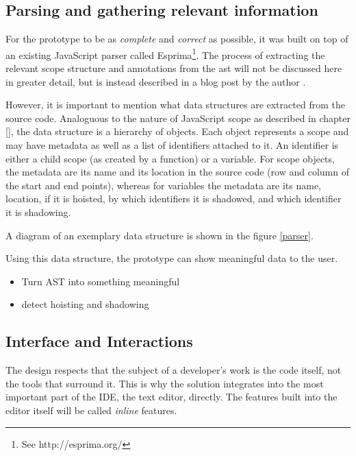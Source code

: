 \subsection{Parsing and gathering relevant
information}\label{parsing-and-gathering-relevant-information}

For the prototype to be as \emph{complete} and \emph{correct} as
possible, it was built on top of an existing JavaScript parser called
Esprima\footnote{See http://esprima.org/}. The process of extracting the
relevant scope structure and annotations from the \ac{ast} will not be
discussed here in greater detail, but is instead described in a blog
post by the author \cite{tvo}.

However, it is important to mention what data structures are extracted
from the source code. Analoguous to the nature of JavaScript scope as
described in chapter \ref{}, the data structure is a hierarchy of
objects. Each object represents a scope and may have metadata as well as
a list of identifiers attached to it. An identifier is either a child
scope (as created by a function) or a variable. For scope objects, the
metadata are its name and its location in the source code (row and
column of the start and end points), whereas for variables the metadata
are its name, location, if it is hoisted, by which identifiers it is
shadowed, and which identifier it is shadowing.

A diagram of an exemplary data structure is shown in the figure
\ref{parser}.

Using this data structure, the prototype can show meaningful data to the
user.

\begin{itemize}
\itemsep1pt\parskip0pt
\item
  Turn AST into something meaningful
\item
  detect hoisting and shadowing
\end{itemize}

\subsection{Interface and
Interactions}\label{interface-and-interactions}

The design respects that the subject of a developer’s work is the code
itself, not the tools that surround it. This is why the solution
integrates into the most important part of the IDE, the text editor,
directly. The features built into the editor itself will be called
\emph{inline} features.

